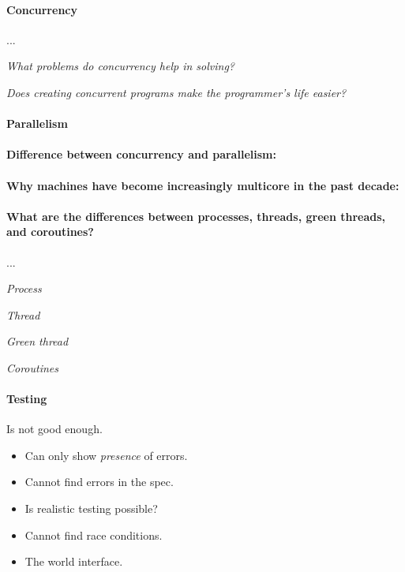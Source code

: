 

\sepline

\paragraph{Concurrency} ...

\textit{What problems do concurrency help in solving?}

\textit{Does creating concurrent programs make the programmer's life easier?}

\paragraph{Parallelism}

\paragraph{Difference between concurrency and parallelism:}

\paragraph{Why machines have become increasingly multicore in the past decade:}

\paragraph{What are the differences between processes, threads, green threads, and coroutines?} ...

\textit{Process}

\textit{Thread}

\textit{Green thread}

\textit{Coroutines}


\paragraph{Testing} Is not good enough.
\begin{itemize}[nolistsep,noitemsep]
	\item Can only show \textit{presence} of errors.
	\item Cannot find errors in the spec.
	\item Is realistic testing possible?
	\item Cannot find race conditions.
	\item The world interface.
\end{itemize}